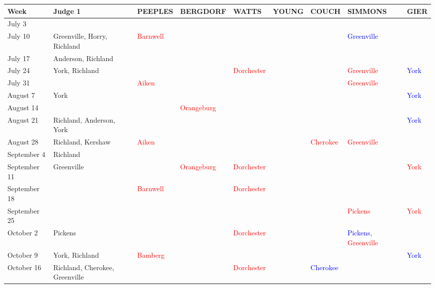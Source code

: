 \documentclass[11pt, oneside]{article}   	%
\newcommand{\rowgroup}[1]{\hspace{-1em}#1}
\theoremstyle{ModifiedStyle}
\begin{document}
\begin{table}[H]
	\centering
	\vspace{-5mm}
	\hspace*{-15mm}
	\setlength\tabcolsep{0pt} %
	{\scriptsize
		\begin{tabular}{L{23mm}C{55mm}C{16mm}C{20mm}C{16mm}C{15mm}C{15mm}C{26mm}C{8mm}}
			\toprule
			\rule{0pt}{2.3ex} Week & Judge 1 & PEEPLES & BERGDORF & WATTS & YOUNG & COUCH & SIMMONS & GIER \\
			\midrule
			July 3 & & & & & & & &\\
			July 10 &  Greenville, Horry, Richland & \textcolor{red}{Barnwell} & & & & &  \textcolor{blue}{Greenville} &\\
			July 17 &  Anderson, Richland & & & & & & &\\
			July 24 &  York, Richland & & &  \textcolor{red}{Dorchester} & & &  \textcolor{red}{Greenville} &  \textcolor{blue}{York} \\
			July 31 & & \textcolor{red}{Aiken} & & & & &  \textcolor{red}{Greenville} &\\
			August 7 &  York & & & & & & &  \textcolor{blue}{York} \\
			August 14 & & & \textcolor{red}{Orangeburg} & & & & &\\
			August 21 &  Richland, Anderson, York & & & & & & &  \textcolor{blue}{York} \\
			August 28 &  Richland, Kershaw & \textcolor{red}{Aiken} & & & &  \textcolor{red}{Cherokee} &  \textcolor{red}{Greenville} &\\
			September 4 &  Richland & & & & & & &\\
			September 11 &  Greenville & & \textcolor{red}{Orangeburg} &  \textcolor{red}{Dorchester} & & & &  \textcolor{red}{York} \\
			September 18 & & \textcolor{red}{Barnwell} & &  \textcolor{red}{Dorchester} & & & &\\
			September 25 & & & & & & &  \textcolor{red}{Pickens} &  \textcolor{red}{York} \\
			October 2 &  Pickens & & &  \textcolor{red}{Dorchester} & & &  \textcolor{blue}{Pickens}, \textcolor{red}{Greenville} &\\
			October 9 &  York, Richland & \textcolor{red}{Bamberg} & & & & & &  \textcolor{blue}{York} \\
			October 16 &  Richland, Cherokee, Greenville & & &  \textcolor{red}{Dorchester} & &  \textcolor{blue}{Cherokee} & &\\

\end{tabular}}
\end{table}
\end{document}
